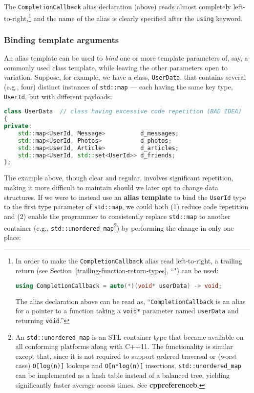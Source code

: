 \noindent The \texttt{CompletionCallback} alias declaration (above) reads almost
completely left-to-right,{\cprotect\footnote{In order to make the
\texttt{CompletionCallback} alias read left-to-right, a
  trailing return (see Section~\ref{trailing-function-return-types}, ``") can be used:

  \begin{lstlisting}[language=C++, basicstyle={\ttfamily\footnotesize}]
  using CompletionCallback = auto(*)(void* userData) -> void;
  \end{lstlisting}\vspace*{-1ex}
      
\noindent The alias declaration above can be read as,
  ``\texttt{CompletionCallback} is an alias for a pointer to a
  function taking a \texttt{void*} parameter named \texttt{userData} and
  returning \texttt{void}.''}} and the name of the alias is clearly
specified after the \texttt{using} keyword.

\subsubsection[Binding template arguments]{Binding template arguments}\label{binding-template-arguments}

An alias template can be used to \emph{bind} one or more template
parameters of, say, a commonly used class template, while leaving the
other parameters open to variation. Suppose, for example, we have a class, \texttt{UserData}, that contains
several (e.g., four) distinct instances of \texttt{std::map} --- each
having the same key type, \texttt{UserId}, but with different payloads:

\begin{lstlisting}[language=C++]
class UserData  // class having excessive code repetition (BAD IDEA)
{
private:
    std::map<UserId, Message>          d_messages;
    std::map<UserId, Photos>           d_photos;
    std::map<UserId, Article>          d_articles;
    std::map<UserId, std::set<UserId>> d_friends;
};
\end{lstlisting}
    
\noindent The example above, though clear and regular, involves significant
repetition, making it more difficult to maintain should we later opt to
change data structures. If we were to instead use an \textbf{alias
template} to bind the \texttt{UserId} type to the first type
parameter of \texttt{std::map}, we could both (1) reduce code repetition
and (2) enable the programmer to consistently replace \texttt{std::map}
to another container
(e.g., \texttt{std::unordered\_map}{\cprotect\footnote{An
\texttt{std::unordered\_map} is an STL container type that became
available on all conforming platforms along with C++11. The
functionality is similar except that, since it is not required to
support ordered traversal or (worst case) \texttt{O[log(n)]} lookups
and \texttt{O[n*log(n)]} insertions, \texttt{std::unordered\_map} can
be implemented as a hash table instead of a balanced tree, yielding
significantly faster average access times. See
  \textbf{cppreferenceb}.}}) by performing the change in only
one place:

